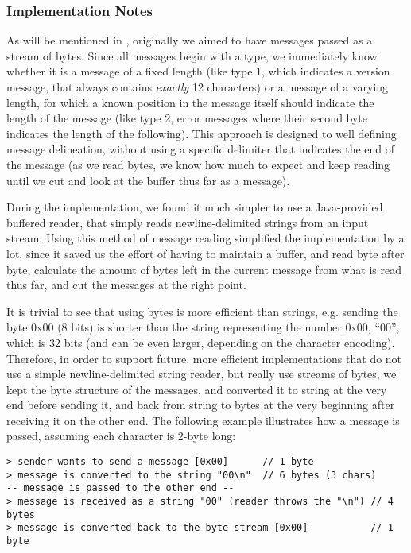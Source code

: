 \subsubsection{Implementation Notes}
\label{sec:pdus:pdu:impl}

As will be mentioned in , originally we aimed to have messages passed as a stream of bytes. Since all messages begin with a type, we immediately know whether it is a message of a fixed length (like type 1, which indicates a version message, that always contains {\em exactly} 12 characters) or a message of a varying length, for which a known position in the message itself should indicate the length of the message (like type 2, error messages where their second byte indicates the length of the following). This approach is designed to well defining message delineation, without using a specific delimiter that indicates the end of the message (as we read bytes, we know how much to expect and keep reading until we cut and look at the buffer thus far as a message).

During the implementation, we found it much simpler to use a Java-provided buffered reader, that simply reads newline-delimited strings from an input stream. Using this method of message reading simplified the implementation by a lot, since it saved us the effort of having to maintain a buffer, and read byte after byte, calculate the amount of bytes left in the current message from what is read thus far, and cut the messages at the right point.

It is trivial to see that using bytes is more efficient than strings, e.g. sending the byte 0x00 (8 bits) is shorter than the string representing the number 0x00, ``00'', which is 32 bits (and can be even larger, depending on the character encoding). Therefore, in order to support future, more efficient implementations that do not use a simple newline-delimited string reader, but really use streams of bytes, we kept the byte structure of the messages, and converted it to string at the very end before sending it, and back from string to bytes at the very beginning after receiving it on the other end. The following example illustrates how a message is passed, assuming each character is 2-byte long:

\begin{verbatim}
> sender wants to send a message [0x00]      // 1 byte
> message is converted to the string "00\n"  // 6 bytes (3 chars)
-- message is passed to the other end --
> message is received as a string "00" (reader throws the "\n") // 4 bytes
> message is converted back to the byte stream [0x00]           // 1 byte
\end{verbatim}


